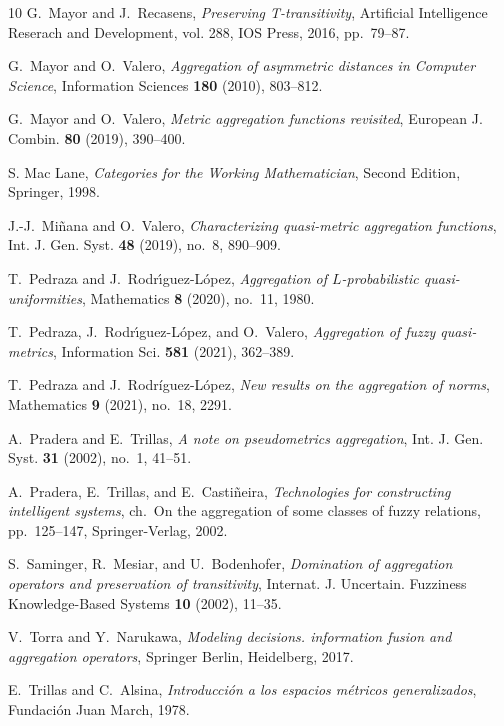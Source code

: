 \documentclass[11pt,a4paper]{amsart}
\theoremstyle{definition}
\begin{document}
\begin{thebibliography}{10}
		G.~Mayor and J.~Recasens, \emph{Preserving {T}-transitivity}, Artificial
		Intelligence Reserach and Development, vol. 288, IOS Press, 2016, pp.~79--87.
		
		G.~Mayor and O.~Valero, \emph{Aggregation of asymmetric distances in {C}omputer
			{S}cience}, Information Sciences \textbf{180} (2010), 803--812.
		
		G.~Mayor and O.~Valero, \emph{Metric aggregation functions revisited}, European J. Combin.
		\textbf{80} (2019), 390--400.
		
		S. Mac Lane, \emph{Categories for the Working Mathematician}, Second Edition, Springer, 1998.
		
		
		J.-J.~Mi\~nana and O.~Valero, \emph{Characterizing quasi-metric aggregation
			functions}, Int. J. Gen. Syst. \textbf{48} (2019), no.~8, 890--909.
		
		T.~Pedraza and J.~Rodr\'{\i}guez-L\'opez, \emph{Aggregation of
			${L}$-probabilistic quasi-uniformities}, Mathematics \textbf{8} (2020),
		no.~11, 1980.
		
		T.~Pedraza, J.~Rodr\'{\i}guez-L\'opez, and O.~Valero, \emph{Aggregation of
			fuzzy quasi-metrics}, Information Sci. \textbf{581} (2021), 362--389.
		
		T.~Pedraza and J.~Rodríguez-López, \emph{New results on the aggregation of
			norms}, Mathematics \textbf{9} (2021), no.~18, 2291.
		
		A.~Pradera and E.~Trillas, \emph{A note on pseudometrics aggregation}, Int. J.
		Gen. Syst. \textbf{31} (2002), no.~1, 41--51.
		
		A.~Pradera, E.~Trillas, and E.~Casti\~neira, \emph{Technologies for
			constructing intelligent systems}, ch.~On the aggregation of some classes of
		fuzzy relations, pp.~125--147, Springer-Verlag, 2002.
		
		S.~Saminger, R.~Mesiar, and U.~Bodenhofer, \emph{Domination of aggregation
			operators and preservation of transitivity}, Internat. J. Uncertain.
		Fuzziness Knowledge-Based Systems \textbf{10} (2002), 11--35.
		
		V.~Torra and Y.~Narukawa, \emph{Modeling decisions. information fusion and
			aggregation operators}, Springer Berlin, Heidelberg, 2017.
		
		E.~Trillas and C.~Alsina, \emph{Introducci\'on a los espacios m\'etricos
			generalizados}, Fundaci\'on Juan March, 1978.
		
	\end{thebibliography}
	
	
	
\end{document}
